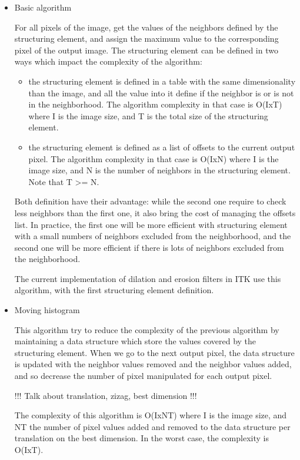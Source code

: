 \documentclass{InsightArticle}
\begin{document}
\begin{itemize}

  \item Basic algorithm

For all pixels of the image, get the values of the neighbors defined by the structuring
element, and assign the maximum value to the corresponding pixel of the output image.
The structuring element can be defined in two ways which impact the complexity of the
algorithm:
  \begin{itemize}
    \item the structuring element is defined in a table with the same dimensionality than
the image, and all the value into it define if the neighbor is or is not in the neighborhood.
The algorithm complexity in that case is O(IxT) where I is the image size, and T is the total
size of the structuring element.
    \item the structuring element is defined as a list of offsets to the current output
pixel.
The algorithm complexity in that case is O(IxN) where I is the image size, and N is the
number of neighbors in the structuring element. Note that T >= N.
  \end{itemize}

Both definition have their advantage: while the second one require to check less neighbors
than the first one, it also bring the cost of managing the offsets list. In practice,
the first one will be more efficient with structuring element with a small numbers of
neighbors excluded from the neighborhood, and the second one will be more efficient if
there is lots of neighbors excluded from the neighborhood.

The current implementation of dilation and erosion filters in ITK use this algorithm,
with the first structuring element definition.

  \item Moving histogram

This algorithm try to reduce the complexity of the previous algorithm by maintaining
a data structure which store the values covered by the structuring element. When we go
to the next output pixel, the data structure is updated with the neighbor values removed
and the neighbor values added, and so decrease the number of pixel manipulated for
each output pixel.

!!! Talk about translation, zizag, best dimension !!!

The complexity of this algorithm is O(IxNT) where I is the image size, and NT the number
of pixel values added and removed to the data structure per translation on the best
dimension.
In the worst case, the complexity is O(IxT).


\end{itemize}
\end{document}
